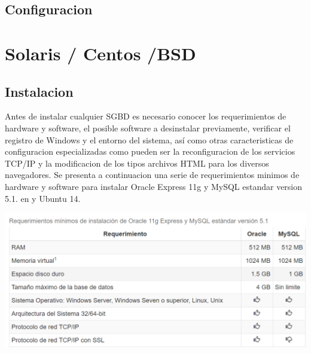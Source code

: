 \documentclass[12pt,letterpaper]{article}
\begin{document}
\subsection{Configuracion}
 \newpage
 
 
 
\section{Solaris / Centos /BSD}
\subsection{Instalacion}
Antes de instalar cualquier SGBD es necesario conocer los requerimientos de hardware y software, el posible software a desinstalar previamente, verificar el registro de Windows y el entorno del sistema, así como otras caracteristicas de configuracion especializadas como pueden ser la reconfiguracion de los servicios TCP/IP y la modificacion de los tipos archivos HTML para los diversos navegadores.
Se presenta a continuacion una serie de requerimientos minimos de hardware y software para instalar Oracle Express 11g y MySQL estandar version 5.1. en y Ubuntu 14.
\begin{center}
\includegraphics[width=15cm]{./IMG/img23}
\end{center}
\end{document}
